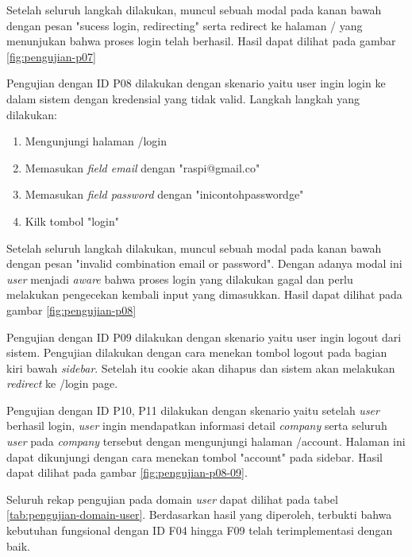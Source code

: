 Setelah seluruh langkah dilakukan, muncul sebuah modal pada kanan bawah dengan pesan "sucess login, redirecting" serta redirect ke halaman / yang menunjukan bahwa proses login telah berhasil. Hasil dapat dilihat pada gambar \ref{fig:pengujian-p07}

Pengujian dengan ID P08 dilakukan dengan skenario yaitu user ingin login ke dalam sistem dengan kredensial yang tidak valid. Langkah langkah yang dilakukan:

\begin{enumerate}
  \item Mengunjungi halaman /login
  \item Memasukan \textit{field email} dengan "raspi@gmail.co"
  \item Memasukan \textit{field password} dengan "inicontohpasswordge"
  \item Kilk tombol "login"
\end{enumerate}

Setelah seluruh langkah dilakukan, muncul sebuah modal pada kanan bawah dengan pesan "invalid combination email or password". Dengan adanya modal ini \textit{user} menjadi \textit{aware} bahwa proses login yang dilakukan gagal dan perlu melakukan pengecekan kembali input yang dimasukkan. Hasil dapat dilihat pada gambar \ref{fig:pengujian-p08}

Pengujian dengan ID P09 dilakukan dengan skenario yaitu user ingin logout dari sistem. Pengujian dilakukan dengan cara menekan tombol logout pada bagian kiri bawah \textit{sidebar}. Setelah itu cookie akan dihapus dan sistem akan melakukan \textit{redirect} ke /login page.

Pengujian dengan ID P10, P11 dilakukan dengan skenario yaitu setelah \textit{user} berhasil login, \textit{user} ingin mendapatkan informasi detail \textit{company} serta seluruh \textit{user} pada \textit{company} tersebut dengan mengunjungi halaman /account. Halaman ini dapat dikunjungi dengan cara menekan tombol "account" pada sidebar. Hasil dapat dilihat pada gambar \ref{fig:pengujian-p08-09}.

Seluruh rekap pengujian pada domain \textit{user} dapat dilihat pada tabel \ref{tab:pengujian-domain-user}. Berdasarkan hasil yang diperoleh, terbukti bahwa kebutuhan fungsional dengan ID F04 hingga F09 telah terimplementasi dengan baik.

